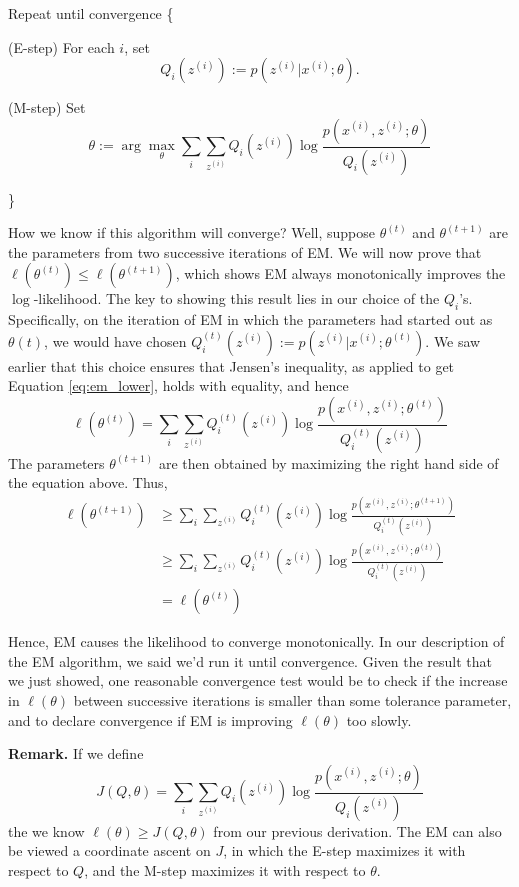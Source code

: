     \qquad Repeat until convergence \{

        \qquad\qquad (E-step) For each $i$, set
                \[
                    Q_i(z^{(i)}) := p(z^{(i)}|x^{(i)}; \theta).
                \]

        \qquad\qquad (M-step) Set
                \[
                    \theta := \arg\max \limits_{\theta} \sum\limits_{i} \sum\limits_{z^{(i)}}
                                Q_i(z^{(i)})\log\frac{p(x^{(i)}, z^{(i)}; \theta)}{Q_i(z^{(i)})}
                \]

    \qquad \}

    How we know if this algorithm will converge? Well, suppose $\theta^{(t)}$ and $\theta^{(t+1)}$ are the
parameters from two successive iterations of EM. We will now prove that
$\ell(\theta^{(t)}) \le \ell(\theta^{(t+1)})$, which shows EM always monotonically improves the $\log$-likelihood.
The key to showing this result lies in our choice of the $Q_i$'s.
Specifically, on the iteration of EM in which the parameters had started out as $\theta(t)$,
we would have chosen $Q_i^{(t)}(z^{(i)}) := p(z^{(i)}|x^{(i)};\theta^{(t)})$. We saw earlier that this choice
ensures that Jensen's inequality, as applied to get Equation \ref{eq:em_lower}, holds with equality, and hence 
\[
    \ell(\theta^{(t)}) = \sum\limits_{i} \sum\limits_{z^{(i)}}
            Q_i^{(t)}(z^{(i)}) \log\frac{p(x^{(i)},z^{(i)};\theta^{(t)})}{Q_i^{(t)}(z^{(i)})}
\]
The parameters $\theta^{(t+1)}$ are then obtained by maximizing the right hand side of the equation above.
Thus,
\begin{align*}
    \ell(\theta^{(t+1)}) & \ge \sum\limits_{i} \sum\limits_{z^{(i)}}
                            Q_i^{(t)}(z^{(i)}) \log\frac{p(x^{(i)},z^{(i)};\theta^{(t+1)})}{Q_i^{(t)}(z^{(i)})} \\
                         & \ge \sum\limits_{i} \sum\limits_{z^{(i)}}
                            Q_i^{(t)}(z^{(i)}) \log\frac{p(x^{(i)},z^{(i)};\theta^{(t)})}{Q_i^{(t)}(z^{(i)})} \\
                         &= \ell(\theta^{(t)})
\end{align*}

    Hence, EM causes the likelihood to converge monotonically. In our description of the EM algorithm,
we said we'd run it until convergence. Given the result that we just showed, one reasonable convergence
test would be to check if the increase in $\ell(\theta)$ between successive iterations is smaller than
some tolerance parameter, and to declare convergence if EM is improving $\ell(\theta)$ too slowly.

\textbf{Remark.} If we define
\[
    J(Q, \theta) = \sum\limits_{i} \sum\limits_{z^{(i)}}
                            Q_i(z^{(i)}) \log\frac{p(x^{(i)}, z^{(i)}; \theta)}{Q_i(z^{(i)})}
\]
the we know $\ell(\theta) \ge J(Q,\theta)$ from our previous derivation.
The EM can also be viewed a coordinate ascent on $J$, in which the E-step maximizes it with respect to $Q$,
and the M-step maximizes it with respect to $\theta$.

\ifx\mlnotes\undefined
    
\fi
